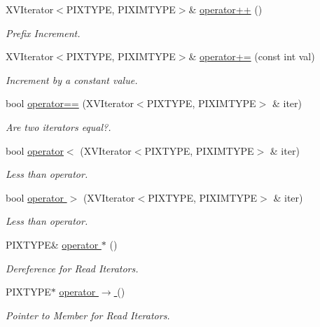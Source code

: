 \begin{CompactItemize}
XVIterator$<$PIXTYPE, PIXIMTYPE$>$\& \hyperlink{class_XVIterator_a9}{operator++} ()
\begin{CompactList}\small\item\em Prefix Increment.\item\end{CompactList}\item 
XVIterator$<$PIXTYPE, PIXIMTYPE$>$\& \hyperlink{class_XVIterator_a10}{operator+=} (const int val)
\begin{CompactList}\small\item\em Increment by a constant value.\item\end{CompactList}\item 
bool \hyperlink{class_XVIterator_a11}{operator==} (XVIterator$<$PIXTYPE, PIXIMTYPE$>$ \& iter)
\begin{CompactList}\small\item\em Are two iterators equal?.\item\end{CompactList}\item 
bool \hyperlink{class_XVIterator_a12}{operator$<$} (XVIterator$<$PIXTYPE, PIXIMTYPE$>$ \& iter)
\begin{CompactList}\small\item\em Less than operator.\item\end{CompactList}\item 
bool \hyperlink{class_XVIterator_a13}{operator $>$} (XVIterator$<$PIXTYPE, PIXIMTYPE$>$ \& iter)
\begin{CompactList}\small\item\em Less than operator.\item\end{CompactList}\item 
PIXTYPE\& \hyperlink{class_XVIterator_a14}{operator $\ast$} ()
\begin{CompactList}\small\item\em Dereference for Read Iterators.\item\end{CompactList}\item 
PIXTYPE$\ast$ \hyperlink{class_XVIterator_a15}{operator $\rightarrow$ } ()
\begin{CompactList}\small\item\em Pointer to Member for Read Iterators.\item\end{CompactList}\item 

\end{CompactItemize}
